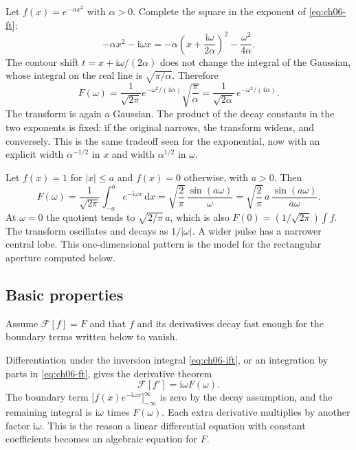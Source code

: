 \begin{example}
Let $f(x)=e^{-\alpha x^2}$ with $\alpha>0$. Complete the square in the exponent of \eqref{eq:ch06-ft}:
\begin{equation}
-\alpha x^2-\mathrm{i}\omega x
=-\alpha\left(x+\frac{\mathrm{i}\omega}{2\alpha}\right)^2-\frac{\omega^2}{4\alpha}.
\end{equation}
The contour shift $t=x+\mathrm{i}\omega/(2\alpha)$ does not change the integral of the Gaussian, whose integral on the real line is $\sqrt{\pi/\alpha}$. Therefore
\begin{equation}
F(\omega)
=\frac{1}{\sqrt{2\pi}}e^{-\omega^2/(4\alpha)}\sqrt{\frac{\pi}{\alpha}}
=\frac{1}{\sqrt{2\alpha}}\,e^{-\omega^2/(4\alpha)}.
\label{eq:ch06-gaussian}
\end{equation}
The transform is again a Gaussian. The product of the decay constants in the two exponents is fixed: if the original narrows, the transform widens, and conversely. This is the same tradeoff seen for the exponential, now with an explicit width $\alpha^{-1/2}$ in $x$ and width $\alpha^{1/2}$ in $\omega$.
\end{example}

\begin{example}
Let $f(x)=1$ for $|x|\leq a$ and $f(x)=0$ otherwise, with $a>0$. Then
\begin{equation}
F(\omega)
=\frac{1}{\sqrt{2\pi}}\int_{-a}^{a}e^{-\mathrm{i}\omega x}\,\mathrm{d}x
=\sqrt{\frac{2}{\pi}}\,\frac{\sin(a\omega)}{\omega}
=\sqrt{\frac{2}{\pi}}\,a\,\frac{\sin(a\omega)}{a\omega}.
\end{equation}
At $\omega=0$ the quotient tends to $\sqrt{2/\pi}\,a$, which is also $F(0)=(1/\sqrt{2\pi})\int f$. The transform oscillates and decays as $1/|\omega|$. A wider pulse has a narrower central lobe. This one-dimensional pattern is the model for the rectangular aperture computed below.
\end{example}

\subsection{Basic properties}

Assume $\mathcal{F}[f]=F$ and that $f$ and its derivatives decay fast enough for the boundary terms written below to vanish.

Differentiation under the inversion integral \eqref{eq:ch06-ift}, or an integration by parts in \eqref{eq:ch06-ft}, gives the derivative theorem
\begin{equation}
\mathcal{F}[f']=\mathrm{i}\omega F(\omega).
\label{eq:ch06-derivative}
\end{equation}
The boundary term $\bigl[f(x)e^{-\mathrm{i}\omega x}\bigr]_{-\infty}^{\infty}$ is zero by the decay assumption, and the remaining integral is $\mathrm{i}\omega$ times $F(\omega)$. Each extra derivative multiplies by another factor $\mathrm{i}\omega$. This is the reason a linear differential equation with constant coefficients becomes an algebraic equation for $F$.

